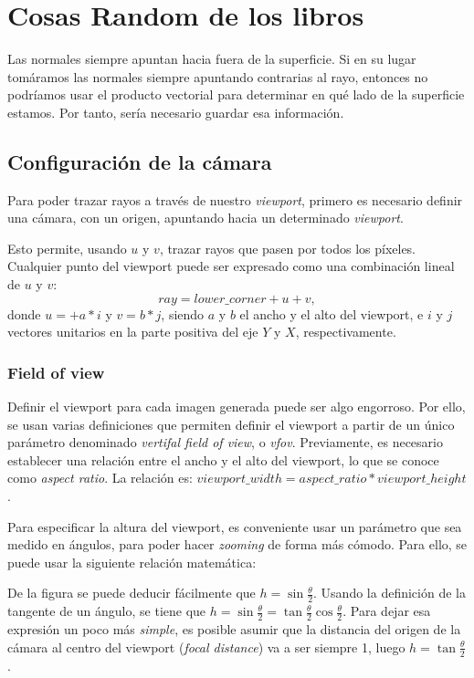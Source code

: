 \chapter{Cosas Random de los libros}

Las normales siempre apuntan hacia fuera de la superficie. Si en su lugar tomáramos las normales siempre apuntando contrarias al rayo, entonces no podríamos usar el producto vectorial para determinar en qué lado de la superficie estamos. Por tanto, sería necesario guardar esa información.


\section{Configuración de la cámara}

Para poder trazar rayos a través de nuestro \textit{viewport}, primero es necesario definir una cámara, con un origen, apuntando hacia un determinado \textit{viewport}.


Esto permite, usando $u$ y $v$, trazar rayos que pasen por todos los píxeles. Cualquier punto del viewport puede ser expresado como una combinación lineal de $u$ y $v$: 
\[
ray=lower\_corner+u+v,
\]
donde $u=+a*i$ y $v=b*j$, siendo $a$ y $b$ el ancho y el alto del viewport, e $i$ y $j$ vectores unitarios en la parte positiva del eje $Y$ y $X$, respectivamente. 

\subsection{Field of view}

Definir el viewport para cada imagen generada puede ser algo engorroso. Por ello, se usan varias definiciones que permiten definir el viewport a partir de un único parámetro denominado \textit{vertifal field of view}, o \textit{vfov}. Previamente, es necesario establecer una relación entre el ancho y el alto del viewport, lo que se conoce como \textit{aspect ratio}. La relación es: $viewport\_width=aspect\_ratio*viewport\_height$.

Para especificar la altura del viewport, es conveniente usar un parámetro que sea medido en ángulos, para poder hacer \textit{zooming} de forma más cómodo. Para ello, se puede usar la siguiente relación matemática:


De la figura se puede deducir fácilmente que $h=\sin\frac{\theta}{2}$. Usando la definición de la tangente de un ángulo, se tiene que $h=\sin\frac{\theta}{2}=\tan\frac{\theta}{2}\cos\frac{\theta}{2}$. Para dejar esa expresión un poco más \textit{simple}, es posible asumir que la distancia del origen de la cámara al centro del viewport (\textit{focal distance}) va a ser siempre 1, luego $h=\tan\frac{\theta}{2}$.

